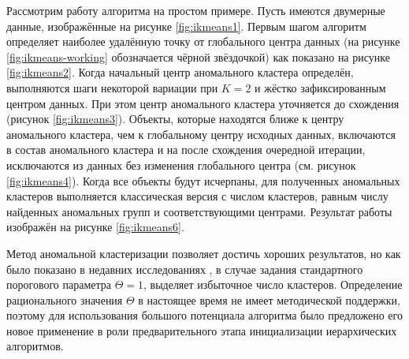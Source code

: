 \documentclass[12pt]{diploma}
\begin{document}
	Рассмотрим работу алгоритма \ikmeans на простом примере. Пусть имеются двумерные данные, изображённые на рисунке \ref{fig:ikmeans1}. Первым шагом алгоритм определяет наиболее удалённую точку от глобального центра данных (на рисунке \ref{fig:ikmeans-working} обозначается чёрной звёздочкой) как показано на рисунке \ref{fig:ikmeans2}. Когда начальный центр аномального кластера определён, выполняются шаги некоторой вариации \kmeans при $ K=2 $ и жёстко зафиксированным центром данных. При этом центр аномального кластера уточняется до схождения (рисунок \ref{fig:ikmeans3}). Объекты, которые находятся ближе к центру аномального кластера, чем к глобальному центру исходных данных, включаются в состав аномального кластера и на после схождения очередной итерации, исключаются из данных без изменения глобального центра (см. рисунок \ref{fig:ikmeans4}). Когда все объекты будут исчерпаны, для полученных аномальных кластеров выполняется классическая версия \kmeans с числом кластеров, равным числу найденных аномальных групп и соответствующими центрами. Результат работы \ikmeans изображён на рисунке \ref{fig:ikmeans6}.	
	
	Метод аномальной кластеризации позволяет достичь хороших результатов, но как было показано в недавних исследованиях \cite{amorim-makarenkov-mirkin}, в случае задания стандартного порогового параметра $ \Theta=1 $, выделяет избыточное число кластеров. Определение рационального значения $ \Theta $ в настоящее время не имеет методической поддержки, поэтому для использования большого потенциала алгоритма было предложено его новое применение в роли предварительного этапа инициализации иерархических алгоритмов. 
		
	
\end{document}
